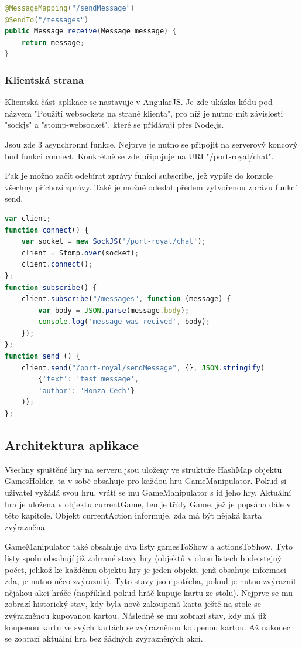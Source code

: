 \documentclass[czech,master,public,dept460,male,cpdeclaration,twoside]{diploma}
\begin{document}
\begin{lstlisting}[language=Java, caption=Implementace websockets v javě]
@MessageMapping("/sendMessage")
@SendTo("/messages")
public Message receive(Message message) {
    return message;
}
\end{lstlisting}

\subsubsection{Klientská strana}
Klientská část aplikace se nastavuje v AngularJS. Je zde ukázka kódu pod názvem "Použití websockets na straně klienta", pro níž je nutno mít závislosti "sockjs" a "stomp-websocket", které se přidávají přes Node.js.

Jsou zde 3 asynchronní funkce. Nejprve je nutno se připojit na serverový koncový bod funkci connect. Konkrétně se zde připojuje na URI "/port-royal/chat". 

Pak je možno začít odebírat zprávy funkcí subscribe, jež vypíše do konzole všechny příchozí zprávy. Také je možné odeslat předem vytvořenou zprávu funkcí send.
\\
\begin{lstlisting}[language=JavaScript, caption=Použití websockets na straně klienta]
var client;      
function connect() {
    var socket = new SockJS('/port-royal/chat');
    client = Stomp.over(socket);
    client.connect();
};
function subscribe() {
    client.subscribe("/messages", function (message) {
        var body = JSON.parse(message.body);
        console.log('message was recived', body);
    });
};
function send () {
    client.send("/port-royal/sendMessage", {}, JSON.stringify(
        {'text': 'test message',
        'author': 'Honza Cech'}
    ));
};
\end{lstlisting}

\subsection{Architektura aplikace}
Všechny spuštěné hry na serveru jsou uloženy ve struktuře HashMap objektu GamesHolder, ta v sobě obsahuje pro každou hru GameManipulator. Pokud si uživatel vyžádá svou hru, vrátí se mu GameManipulator s id jeho hry. Aktuální hra je uložena v objektu currentGame, ten je třídy Game, jež je popsána dále v této kapitole. Objekt currentAction informuje, zda má být nějaká karta zvýrazněna.

GameManipulator také obsahuje dva listy gamesToShow a actionsToShow. Tyto listy spolu obsahují již zahrané stavy hry (objektů v obou listech bude stejný počet, jelikož ke každému objektu hry je jeden objekt, jenž obsahuje informaci zda, je nutno něco zvýraznit). Tyto stavy jsou potřeba, pokud je nutno zvýraznit nějakou akci hráče (například pokud hráč kupuje kartu ze stolu). Nejprve se mu zobrazí historický stav, kdy byla nově zakoupená karta ještě na stole se zvýrazněnou kupovanou kartou. Následně se mu zobrazí stav, kdy má již koupenou kartu ve svých kartách se zvýrazněnou koupenou kartou. Až nakonec se zobrazí aktuální hra bez žádných zvýrazněných akcí.
\end{document}
